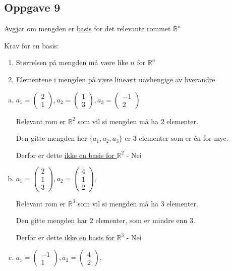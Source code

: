 \documentclass{article}
\newcommand{\vect}[1]{\begin{pmatrix} #1 \end{pmatrix}}
\newcommand{\uu}[1]{\underline{\underline{#1}}}
\begin{document}
\newpage
\subsection*{Oppgave 9}
Avgjør om mengden er \underline{basis} for det relevante rommet $\mathbb{R}^n$

Krav for en basis:
\begin{enumerate}
    \item Størrelsen på mengden må være like $n$ for $\mathbb{R}^n$
    \item Elementene i mengden på være lineært uavhengige av hverandre
\end{enumerate}

\begin{enumerate}[a)]

\item \(
a_1=\vect{2\\1},
a_2=\vect{1\\3},
a_3=\vect{-1\\2}
\)

\vspace{1em}

Relevant rom er $\mathbb{R}^2$ som vil si mengden må ha 2 elementer.

Den gitte mengden her $\{a_1, a_2, a_3\}$ er 3 elementer som er én for mye.

Derfor er dette \uu{ikke en basis for $\mathbb{R}^2$} - Nei

\vspace{5em}

\item \(
a_1=\vect{2\\1\\3},
a_2=\vect{4\\1\\2},
\)

\vspace{1em}

Relevant rom er $\mathbb{R}^3$ som vil si mengden må ha 3 elementer.

Den gitte mengden har 2 elementer, som er mindre enn 3.

Derfor er dette \uu{ikke en basis for $\mathbb{R}^3$} - Nei


\vspace{5em}

\item \(
a_1=\vect{-1\\1},
a_2=\vect{4\\2},
\)

\vspace{1em}


\end{enumerate}
\end{document}
